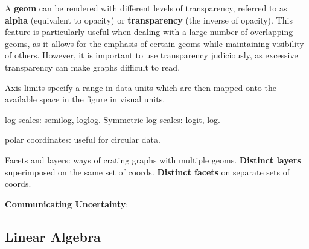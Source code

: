 \documentclass{article}
\begin{document}
\noindent A \textbf{geom} can be rendered with different levels of transparency, 
referred to as \textbf{alpha} (equivalent to opacity) or 
\textbf{transparency} (the inverse of opacity). 
This feature is particularly useful when dealing with a large number 
of overlapping geoms, as it allows for the emphasis of certain geoms 
while maintaining visibility of others. 
However, it is important to use transparency judiciously, as excessive 
transparency can make graphs difficult to read.

\noindent Axis limits specify a range in data units which are then mapped onto the available space in the figure in visual units.

\noindent log scales: semilog, loglog. Symmetric log scales: logit, log.

\noindent polar coordinates: useful for circular data.

\noindent Facets and layers: ways of crating graphs with multiple geoms.
\textbf{Distinct layers} superimposed on the same set of coords.
\textbf{Distinct facets} on separate sets of coords.

\noindent \textbf{Communicating Uncertainty}: 








\subsection*{Linear Algebra}
\end{document}
